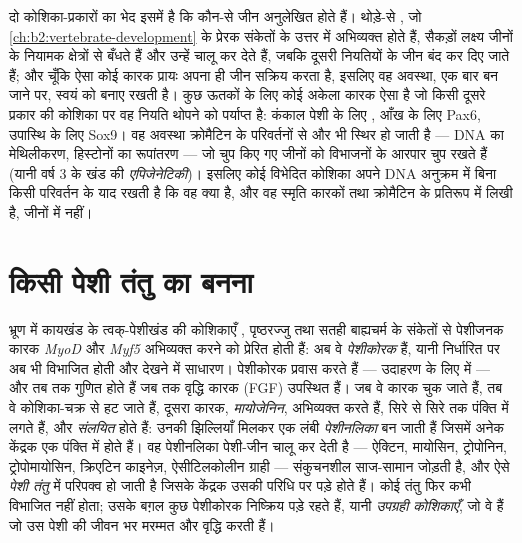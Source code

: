 \begin{proposition}[विभेदन अनुलेखनी है]\label{prop:b2:cell-differentiation:transcriptional}
दो कोशिका-प्रकारों का भेद इसमें है कि कौन-से जीन
अनुलेखित होते हैं। थोड़े-से \emph{}, जो
\cref{ch:b2:vertebrate-development} के प्रेरक संकेतों के उत्तर में
अभिव्यक्त होते हैं, सैकड़ों लक्ष्य जीनों के नियामक क्षेत्रों से बँधते
हैं और उन्हें चालू कर देते हैं, जबकि दूसरी नियतियों के जीन बंद कर दिए
जाते हैं; और चूँकि ऐसा कोई कारक प्रायः अपना ही जीन सक्रिय करता है,
इसलिए वह अवस्था, एक बार बन जाने पर, स्वयं को बनाए रखती है।
कुछ ऊतकों के लिए कोई अकेला कारक ऐसा \emph{} है
जो किसी दूसरे प्रकार की कोशिका पर वह नियति थोपने को पर्याप्त है: कंकाल
पेशी के लिए , आँख के लिए Pax6, उपास्थि के लिए Sox9। वह अवस्था
क्रोमैटिन के परिवर्तनों से और भी स्थिर हो जाती है --- DNA का
मेथिलीकरण, हिस्टोनों का रूपांतरण --- जो चुप किए गए जीनों को
विभाजनों के आरपार चुप रखते हैं (यानी वर्ष 3 के खंड की
\emph{एपिजेनेटिकी})। इसलिए कोई विभेदित कोशिका अपने DNA अनुक्रम में बिना
किसी परिवर्तन के याद रखती है कि वह क्या है, और वह स्मृति
कारकों तथा क्रोमैटिन के प्रतिरूप में लिखी है, जीनों में नहीं।
\end{proposition}

\section{किसी पेशी तंतु का बनना}

\begin{definition}[पेशीजनन]\label{def:b2:cell-differentiation:myogenesis}
भ्रूण में कायखंड के त्वक्-पेशीखंड की कोशिकाएँ ,
पृष्ठरज्जु तथा सतही बाह्यचर्म के संकेतों से
पेशीजनक कारक \emph{MyoD} और \emph{Myf5} अभिव्यक्त करने को प्रेरित होती
हैं: अब वे \emph{पेशीकोरक} हैं, यानी निर्धारित पर अब भी विभाजित होती और
देखने में साधारण। पेशीकोरक प्रवास करते हैं --- उदाहरण के लिए
 में --- और तब तक गुणित होते हैं जब तक वृद्धि कारक (FGF)
उपस्थित हैं। जब वे कारक चुक जाते हैं, तब वे कोशिका-चक्र से हट जाते हैं,
दूसरा कारक, \emph{मायोजेनिन}, अभिव्यक्त करते हैं, सिरे से सिरे तक
पंक्ति में लगते हैं, और \emph{संलयित} होते हैं:
उनकी झिल्लियाँ मिलकर एक लंबी \emph{पेशीनलिका} बन जाती हैं जिसमें अनेक
केंद्रक एक पंक्ति में होते हैं। वह पेशीनलिका पेशी-जीन चालू कर देती है ---
ऐक्टिन, मायोसिन, ट्रोपोनिन, ट्रोपोमायोसिन, क्रिएटिन काइनेज़,
ऐसीटिलकोलीन ग्राही --- संकुचनशील साज-सामान जोड़ती है, और ऐसे
\emph{पेशी तंतु} में परिपक्व हो जाती है जिसके केंद्रक उसकी परिधि पर
पड़े होते हैं। कोई तंतु फिर कभी विभाजित नहीं होता; उसके बग़ल कुछ
पेशीकोरक निष्क्रिय पड़े रहते हैं, यानी \emph{उपग्रही कोशिकाएँ}, जो वे
 हैं जो उस पेशी की जीवन भर मरम्मत और वृद्धि करती हैं।
\end{definition}

